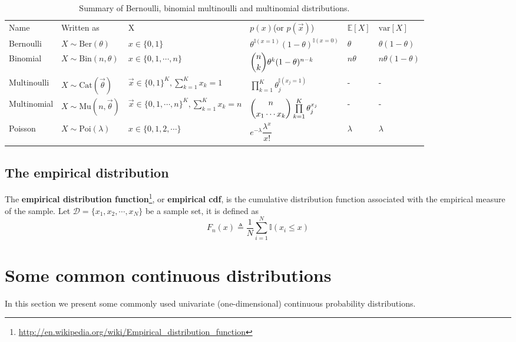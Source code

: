 \begin{table*}
\caption{Summary of Bernoulli, binomial multinoulli and multinomial distributions.}
\label{tab:Summary-distribution}
\centering
\begin{tabular}{llllll}
\hline\noalign{\smallskip}
Name & Written as & X & $p(x)$(or $p(\vec{x})$) & $\mathbb{E}[X]$ & $\text{var}[X]$ \\
\noalign{\smallskip}\svhline\noalign{\smallskip}
Bernoulli & $X \sim \text{Ber}(\theta)$ & $x \in \{0,1\}$ & $\theta^{\mathbb{I}(x=1)}(1-\theta)^{\mathbb{I}(x=0)}$ & $\theta$ & $\theta(1-\theta)$ \\
Binomial & $X \sim \text{Bin}(n,\theta)$ & $x \in \{0,1,\cdots,n\}$ & $\dbinom{n}{k}\theta^k(1-\theta)^{n-k}$ & $n\theta$ & $n\theta(1-\theta)$ \\
Multinoulli & $X \sim \text{Cat}(\vec{\theta})$ & $\vec{x} \in \{0,1\}^K, \sum_{k=1}^K x_k=1$ & $\prod\limits_{k=1}^K\theta_j^{\mathbb{I}(x_j=1)}$ & - & - \\
Multinomial & $X \sim \text{Mu}(n,\vec{\theta})$ & $\vec{x} \in \{0,1,\cdots,n\}^K, \sum_{k=1}^K x_k=n$ & $\dbinom{n}{x_1 \cdots x_k} \prod\limits_{k=1}^K\theta_j^{x_j}$ & - & - \\
Poisson & $X \sim \text{Poi}(\lambda)$ & $x \in \{0,1,2,\cdots\}$ & $e^{-\lambda}\dfrac{\lambda^x}{x!}$ & $\lambda$ & $\lambda$ \\
\noalign{\smallskip}\hline
\end{tabular}
\end{table*}


\subsection{The empirical distribution}
The \textbf{empirical distribution function}\footnote{\url{http://en.wikipedia.org/wiki/Empirical_distribution_function}}, or \textbf{empirical cdf}, is the cumulative distribution function associated with the empirical measure of the sample. Let $\mathcal{D}=\{x_1,x_2,\cdots,x_N\}$ be a sample set, it is defined as 
\begin{equation}
F_n(x) \triangleq \dfrac{1}{N}\sum\limits_{i=1}^N\mathbb{I}(x_i \leq x)
\end{equation}


\section{Some common continuous distributions}
In this section we present some commonly used univariate (one-dimensional) continuous probability distributions.


